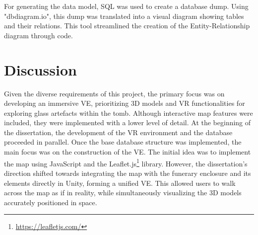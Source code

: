 For generating the data model, SQL was used to create a database dump.
Using "dbdiagram.io", this dump was translated into a visual diagram showing tables and their relations. This tool streamlined the creation of the Entity-Relationship diagram through code.

\FloatBarrier
\section{Discussion} %
\label{sec:discussion_design}

Given the diverse requirements of this project, the primary focus was on developing an immersive \gls{VE}, prioritizing \gls{3D} models and \gls{VR} functionalities for exploring glass artefacts within the tomb. Although interactive map features were included, they were implemented with a lower level of detail.
At the beginning of the dissertation, the development of the \gls{VR} environment and the database proceeded in parallel. Once the base database structure was implemented, the main focus was on the construction of the \gls{VE}. The initial idea was to implement the map using JavaScript and the Leaflet.js\footnote{\url{https://leafletjs.com/}} library. However, the dissertation's direction shifted towards integrating the map with the funerary enclosure and its elements directly in Unity, forming a unified \gls{VE}. This allowed users to walk across the map as if in reality, while simultaneously visualizing the \gls{3D} models accurately positioned in space.







